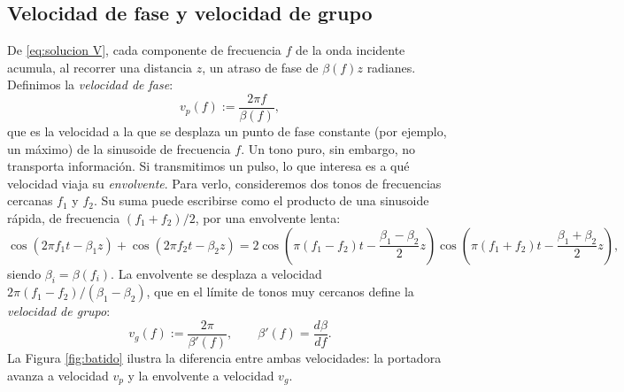 \subsection*{Velocidad de fase y velocidad de grupo}

De \eqref{eq:solucion V}, cada componente de frecuencia $f$ de la onda incidente acumula, al recorrer una distancia $z$, un atraso de fase de $\beta(f) z$ radianes. Definimos la \emph{velocidad de fase}:
\begin{equation*}
    v_p(f) := \frac{2\pi f}{\beta(f)},
\end{equation*}
que es la velocidad a la que se desplaza un punto de fase constante (por ejemplo, un máximo) de la sinusoide de frecuencia $f$. Un tono puro, sin embargo, no transporta información. Si transmitimos un pulso, lo que interesa es a qué velocidad viaja su \emph{envolvente}. Para verlo, consideremos dos tonos de frecuencias cercanas $f_1$ y $f_2$. Su suma puede escribirse como el producto de una sinusoide rápida, de frecuencia $(f_1+f_2)/2$, por una envolvente lenta:
\begin{equation*}
    \cos(2\pi f_1 t - \beta_1 z) + \cos(2\pi f_2 t - \beta_2 z) = 2\cos\left(\pi(f_1-f_2) t - \frac{\beta_1-\beta_2}{2} z\right)\cos\left(\pi(f_1+f_2) t - \frac{\beta_1+\beta_2}{2} z\right),
\end{equation*}
siendo $\beta_i=\beta(f_i)$. La envolvente se desplaza a velocidad $2\pi(f_1-f_2)/(\beta_1-\beta_2)$, que en el límite de tonos muy cercanos define la \emph{velocidad de grupo}:
\begin{equation*}
    v_g(f) := \frac{2\pi}{\beta'(f)}, \qquad \beta'(f) = \frac{d\beta}{df}.
\end{equation*}
La Figura \ref{fig:batido} ilustra la diferencia entre ambas velocidades: la portadora avanza a velocidad $v_p$ y la envolvente a velocidad $v_g$.

